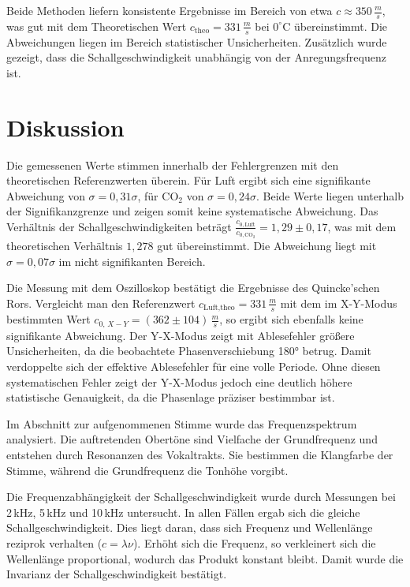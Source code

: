 Beide Methoden liefern konsistente Ergebnisse im Bereich von etwa $c \approx 350\,\frac{m}{s}$, was gut mit dem Theoretischen Wert $c_\text{theo} = 331\,\frac{m}{s}$ bei $0^\circ$C übereinstimmt. Die Abweichungen liegen im Bereich statistischer Unsicherheiten. Zusätzlich wurde gezeigt, dass die Schallgeschwindigkeit unabhängig von der Anregungsfrequenz ist.

\section{Diskussion}

Die gemessenen Werte stimmen innerhalb der Fehlergrenzen mit den theoretischen Referenzwerten überein. Für Luft ergibt sich eine signifikante Abweichung von $\sigma = 0{,}31\sigma$, für CO$_2$ von $\sigma = 0{,}24\sigma$. Beide Werte liegen unterhalb der Signifikanzgrenze und zeigen somit keine systematische Abweichung. Das Verhältnis der Schallgeschwindigkeiten beträgt $\frac{c_{0,\text{Luft}}}{c_{0,\text{CO}_2}} = 1{,}29 \pm 0{,}17$, was mit dem theoretischen Verhältnis $1{,}278$ gut übereinstimmt. Die Abweichung liegt mit $\sigma = 0{,}07\sigma$ im nicht signifikanten Bereich.

Die Messung mit dem Oszilloskop bestätigt die Ergebnisse des Quincke'schen Rors. Vergleicht man den Referenzwert $c_{\text{Luft,theo}} = 331\,\frac{m}{s}$ mit dem im X-Y-Modus bestimmten Wert $c_{0,\,X\!-\!Y} = (362 \pm 104)\,\frac{m}{s}$, so ergibt sich ebenfalls keine signifikante Abweichung. Der Y-X-Modus zeigt mit Ablesefehler größere Unsicherheiten, da die beobachtete Phasenverschiebung 180° betrug. Damit verdoppelte sich der effektive Ablesefehler für eine volle Periode. Ohne diesen systematischen Fehler zeigt der Y-X-Modus jedoch eine deutlich höhere statistische Genauigkeit, da die Phasenlage präziser bestimmbar ist.

Im Abschnitt zur aufgenommenen Stimme wurde das Frequenzspektrum analysiert. Die auftretenden Obertöne sind Vielfache der Grundfrequenz und entstehen durch Resonanzen des Vokaltrakts. Sie bestimmen die Klangfarbe der Stimme, während die Grundfrequenz die Tonhöhe vorgibt.

Die Frequenzabhängigkeit der Schallgeschwindigkeit wurde durch Messungen bei 2\,kHz, 5\,kHz und 10\,kHz untersucht. In allen Fällen ergab sich die gleiche Schallgeschwindigkeit. Dies liegt daran, dass sich Frequenz und Wellenlänge reziprok verhalten ($c = \lambda \nu$). Erhöht sich die Frequenz, so verkleinert sich die Wellenlänge proportional, wodurch das Produkt konstant bleibt. Damit wurde die Invarianz der Schallgeschwindigkeit bestätigt.

